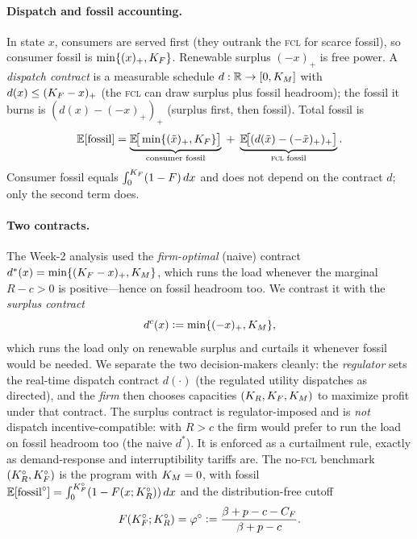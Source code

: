 \paragraph{Dispatch and fossil accounting.} In state $x$, consumers are served first
(they outrank the \textsc{fcl} for scarce fossil), so consumer fossil is
$\min\{(x)_+,K_F\}$. Renewable surplus $(-x)_+$ is free power. A \emph{dispatch
contract} is a measurable schedule $d:\mathbb R\to[0,K_M]$ with
$d(x)\le(K_F-x)_+$ (the \textsc{fcl} can draw surplus plus fossil headroom); the
fossil it burns is $(d(x)-(-x)_+)_+$ (surplus first, then fossil). Total fossil is
\begin{equation}\label{r1w3-eq:totfossil}
  \mathbb{E}[\mathrm{fossil}]=\underbrace{\mathbb{E}\!\big[\min\{(\tilde x)_+,K_F\}\big]}_{\text{consumer fossil}}
  \;+\;\underbrace{\mathbb{E}\!\big[(d(\tilde x)-(-\tilde x)_+)_+\big]}_{\text{\textsc{fcl} fossil}} .
\end{equation}
Consumer fossil equals $\int_0^{K_F}(1-F)\,dx$ and does not depend on the contract
$d$; only the second term does.

\paragraph{Two contracts.} The Week-2 analysis used the \emph{firm-optimal} (naive)
contract $d^{*}(x)=\min\{(K_F-x)_+,K_M\}$, which runs the load whenever the marginal
$R-c>0$ is positive---hence on fossil headroom too. We contrast it with the
\emph{surplus contract}
\begin{equation}\label{r1w3-eq:surpcontract}
  d^{c}(x)\vcentcolon=\min\{(-x)_+,K_M\} ,
\end{equation}
which runs the load only on renewable surplus and curtails it whenever fossil would be
needed. We separate the two decision-makers cleanly: the \emph{regulator} sets the
real-time dispatch contract $d(\cdot)$ (the regulated utility dispatches as directed),
and the \emph{firm} then chooses capacities $(K_R,K_F,K_M)$ to maximize profit under
that contract. The surplus contract is regulator-imposed and is \emph{not} dispatch
incentive-compatible: with $R>c$ the firm would prefer to run the load on fossil
headroom too (the naive $d^{*}$). It is enforced as a curtailment rule, exactly as
demand-response and interruptibility tariffs are. The no-\textsc{fcl} benchmark
$(K_R^{\circ},K_F^{\circ})$ is the program with $K_M=0$, with fossil
$\mathbb{E}[\mathrm{fossil}^{\circ}]=\int_0^{K_F^{\circ}}(1-F(x;K_R^{\circ}))\,dx$ and the distribution-free
cutoff
\begin{equation}\label{r1w3-eq:phio}
  F(K_F^{\circ};K_R^{\circ})=\varphi^{\circ}\vcentcolon=\frac{\beta+p-c-C_F}{\beta+p-c}.
\end{equation}

